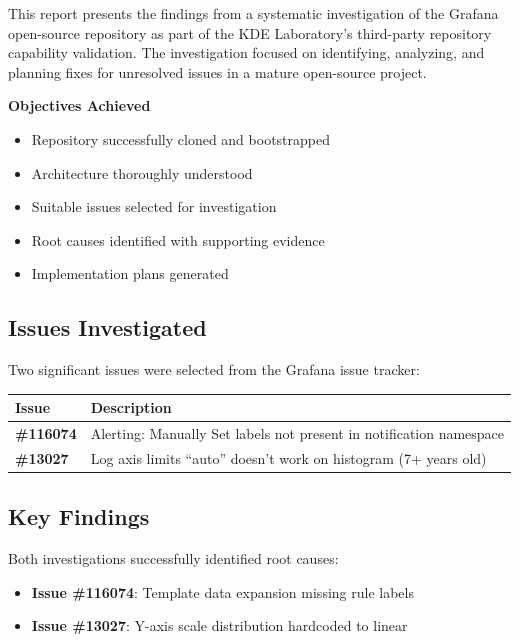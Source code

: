 \documentclass[
    11pt,
    a4paper,
    oneside,
    abstract=on,
    parskip=full+,
    headings=big,
    bibliography=totoc
]{scrartcl}
\begin{document}
This report presents the findings from a systematic investigation of the Grafana open-source repository as part of the KDE Laboratory's third-party repository capability validation. The investigation focused on identifying, analyzing, and planning fixes for unresolved issues in a mature open-source project.

\begin{context}
    \textbf{Objectives Achieved}
    \begin{itemize}
        \item Repository successfully cloned and bootstrapped
        \item Architecture thoroughly understood
        \item Suitable issues selected for investigation
        \item Root causes identified with supporting evidence
        \item Implementation plans generated
    \end{itemize}
\end{context}

\subsection{Issues Investigated}

Two significant issues were selected from the Grafana issue tracker:

\begin{longtable}{|l|p{9cm}|}
    \hline
    \rowcolor{kde-light}
    \textbf{Issue} & \textbf{Description} \\
    \hline
    \endhead
    \textbf{\#116074} & Alerting: Manually Set labels not present in notification namespace \\
    \hline
    \textbf{\#13027} & Log axis limits ``auto'' doesn't work on histogram (7+ years old) \\
    \hline
\end{longtable}

\subsection{Key Findings}

\begin{keyfinding}
    Both investigations successfully identified root causes:
    \begin{itemize}
        \item \textbf{Issue \#116074}: Template data expansion missing rule labels
        \item \textbf{Issue \#13027}: Y-axis scale distribution hardcoded to linear
    \end{itemize}
\end{keyfinding}
\end{document}

